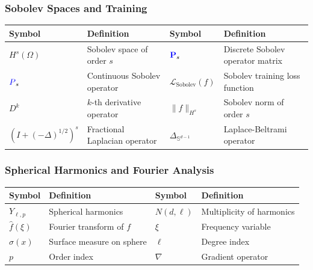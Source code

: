\documentclass[a4paper]{article}
\theoremstyle{plain}
\theoremstyle{definition}
\theoremstyle{remark}
\begin{document}
\begin{tcolorbox}[colback=blue!5,colframe=blue!50!black,title={\large \textbf{Mathematical Notation Reference}},enhanced,drop shadow]

\newpage
\subsubsection*{Sobolev Spaces and Training}
\begin{longtable}{p{}p{}p{}p{}}
\toprule
\textbf{Symbol} & \textbf{Definition} & \textbf{Symbol} & \textbf{Definition} \\
\midrule
$H^s(\Omega)$ & Sobolev space of order $s$ & $\textcolor{blue}{\mathbf{P}}_s$ & Discrete Sobolev operator matrix \\
$\textcolor{blue}{P}_s$ & Continuous Sobolev operator & $\mathcal{L}_{\text{Sobolev}}(f)$ & Sobolev training loss function \\
$D^k$ & $k$-th derivative operator & $\|f\|_{H^s}$ & Sobolev norm of order $s$ \\
$(I + (-\Delta)^{1/2})^s$ & Fractional Laplacian operator & $\Delta_{\mathbb{S}^{d-1}}$ & Laplace-Beltrami operator \\
\bottomrule
\end{longtable}

\subsubsection*{Spherical Harmonics and Fourier Analysis}
\begin{longtable}{p{}p{}p{}p{}}
\toprule
\textbf{Symbol} & \textbf{Definition} & \textbf{Symbol} & \textbf{Definition} \\
\midrule
$Y_{\ell,p}$ & Spherical harmonics & $N(d,\ell)$ & Multiplicity of harmonics \\
$\hat{f}(\xi)$ & Fourier transform of $f$ & $\xi$ & Frequency variable \\
$\sigma(x)$ & Surface measure on sphere & $\ell$ & Degree index \\
$p$ & Order index & $\nabla$ & Gradient operator \\
\bottomrule
\end{longtable}


\end{tcolorbox}
\end{document}
